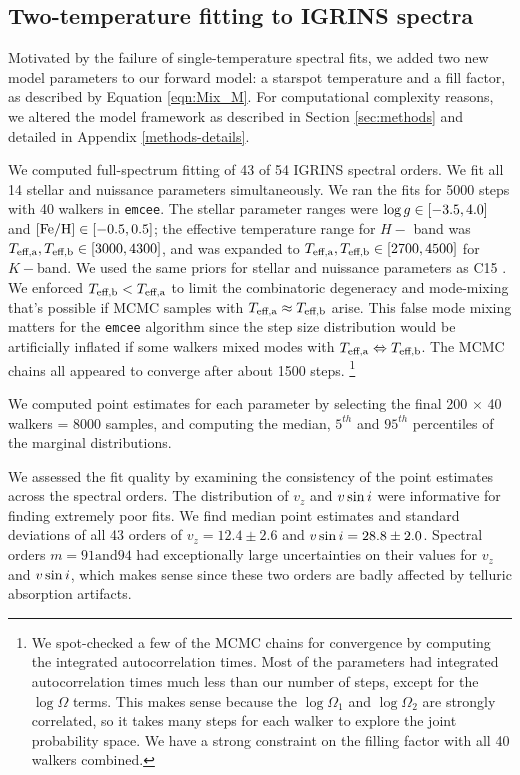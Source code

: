 \documentclass[onecolumn]{emulateapj}%
\newcommand{\iancze}{{\sc C15 }}
\begin{document}
\subsection{Two-temperature fitting to IGRINS spectra}

Motivated by the failure of single-temperature spectral fits, we added two new model parameters to our forward model: a starspot temperature and a fill factor, as described by Equation \ref{eqn:Mix_M}.  For computational complexity reasons, we altered the model framework as described in Section \ref{sec:methods} and detailed in Appendix \ref{methods-details}.  

We computed full-spectrum fitting of 43 of 54 IGRINS spectral orders.  We fit all 14 stellar and nuissance parameters simultaneously.  We ran the fits for 5000 steps with 40 walkers in \texttt{emcee}.  The stellar parameter ranges were $\log g \in [-3.5, 4.0]$ and $[{\rm Fe}/{\rm H}] \in [-0.5, 0.5]$; the effective temperature range for $H-$ band was $T_\textrm{eff,a}, T_\textrm{eff,b} \in [3000, 4300]$, and was expanded to $T_\textrm{eff,a}, T_\textrm{eff,b} \in [2700, 4500]$ for $K-$band.  We used the same priors for stellar and nuissance parameters as \iancze.  We enforced $T_\textrm{eff,b} < T_\textrm{eff,a}$ to limit the combinatoric degeneracy and mode-mixing that's possible if MCMC samples with $T_\textrm{eff,a} \approx T_\textrm{eff,b}$ arise.  This false mode mixing matters for the \texttt{emcee} algorithm since the step size distribution would be artificially inflated if some walkers mixed modes with $T_\textrm{eff,a} \Leftrightarrow T_\textrm{eff,b}$.  The MCMC chains all appeared to converge after about 1500 steps.  \footnote{We spot-checked a few of the MCMC chains for convergence by computing the integrated autocorrelation times.  Most of the parameters had integrated autocorrelation times much less than our number of steps, except for the $\log{\Omega}$ terms.  This makes sense because the $\log{\Omega_1}$ and $\log{\Omega_2}$ are strongly correlated, so it takes many steps for each walker to explore the joint probability space.  We have a strong constraint on the filling factor with all 40 walkers combined.}


We computed point estimates for each parameter by selecting the final 200 $\times$ 40 walkers = 8000 samples, and computing the median, $5^{th}$ and $95^{th}$ percentiles of the marginal distributions.

We assessed the fit quality by examining the consistency of the point estimates across the spectral orders.  The distribution of $v_z$ and $v \sin i$ were informative for finding extremely poor fits.  We find median point estimates and standard deviations of all 43 orders of $v_z = 12.4 \pm 2.6$ and $v \sin i = 28.8 \pm 2.0$.  Spectral orders $m=91 \mathrm{ and }94$ had exceptionally large uncertainties on their values for $v_z$ and $v \sin i$, which makes sense since these two orders are badly affected by telluric absorption artifacts.
\end{document}

